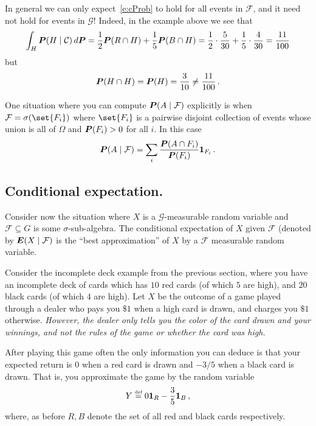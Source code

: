 \begin{remark}
  In general we can only expect~\eqref{e:cProb} to hold for all events in $\mathcal F$, and it need not hold for events in $\mathcal G$!
  Indeed, in the example above we see that
  \begin{equation*}
    \int_H \P( H \given \mathcal C) \, d\P
      = \frac{1}{2} \P(R \cap H) + \frac{1}{5} \P( B \cap H )
      = \frac{1}{2} \cdot \frac{5}{30} + \frac{1}{5} \cdot \frac{4}{30}
      = \frac{11}{100}
  \end{equation*}
  but
  \begin{equation*}
      \P(H \cap H) = \P(H) = \frac{3}{10} \neq \frac{11}{100}\,.
  \end{equation*}
\end{remark}

\begin{remark}
  One situation where you can compute $\P( A \given \mathcal F)$ explicitly is when $\mathcal F = \sigma( \set{F_i} )$ where $\set{F_i}$ is a pairwise disjoint collection of events whose union is all of $\Omega$ and $\P(F_i) > 0 $ for all $i$.
  In this case
  \begin{equation*}
    \P(A \given \mathcal F)
      = \sum_i \frac{\P( A \cap F_i )}{\P(F_i)} \one_{F_i} \,.
  \end{equation*}
\end{remark}

\subsection{Conditional expectation.}

Consider now the situation where $X$ is a $\mathcal G$-measurable random variable and $\mathcal F \subseteq G$ is some $\sigma$-sub-algebra.
The conditional expectation of $X$ given $\mathcal F$ (denoted by $\E( X \given \mathcal F)$ is the ``best approximation'' of $X$ by a $\mathcal F$ measurable random variable.

Consider the incomplete deck example from the previous section, where you have an incomplete deck of cards which has $10$ red cards (of which $5$ are high), and $20$ black cards (of which $4$ are high).
Let $X$ be the outcome of a game played through a dealer who pays you $\$1$ when a high card is drawn, and charges you $\$1$ otherwise.
\emph{However, the dealer only tells you the color of the card drawn and your winnings, and not the rules of the game or whether the card was high.}

After playing this game often the only information you can deduce is that your expected return is $0$ when a red card is drawn and $-3/5$ when a black card is drawn.
That is, you approximate the game by the random variable
\begin{equation*}
  Y \defeq 0 \one_R - \frac{3}{5} \one_B\,,
\end{equation*}
where, as before $R, B$ denote the set of all red and black cards respectively. 

